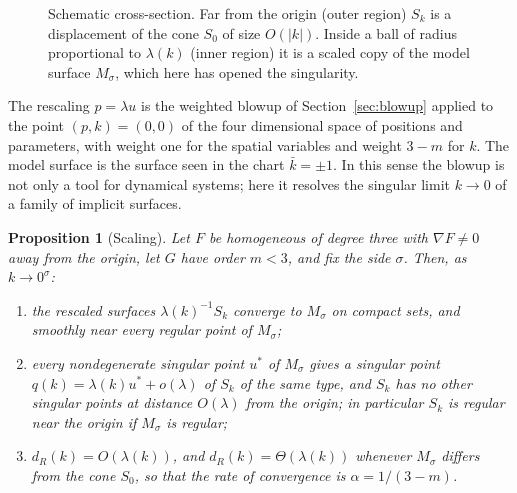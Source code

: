 \documentclass[12pt, a4paper, oneside]{book}
\theoremstyle{plain}
\newtheorem{proposition}[theorem]{Proposition}
\theoremstyle{definition}
\theoremstyle{remark}
\begin{document}
\begin{figure}[!h]
\centering
{}
\caption[Inner and outer region]{Schematic cross-section. Far from the origin
(outer region) $S_k$ is a displacement of the cone $S_0$ of size $O(|k|)$.
Inside a ball of radius proportional to $\lambda(k)$ (inner region) it is a
scaled copy of the model surface $M_\sigma$, which here has opened the
singularity.}
\label{fig:inner-outer}
\end{figure}

The rescaling $p=\lambda u$ is the weighted blowup of
Section~\ref{sec:blowup} applied to the point $(p,k)=(0,0)$ of the four
dimensional space of positions and parameters, with weight one for the spatial
variables and weight $3-m$ for $k$. The model surface is the surface seen in
the chart $\bar k=\pm1$. In this sense the blowup is not only a tool for
dynamical systems; here it resolves the singular limit $k\to0$ of a family of
implicit surfaces.

\begin{proposition}[Scaling]
\label{prop:scaling}
Let $F$ be homogeneous of degree three with $\nabla F\neq0$ away from the
origin, let $G$ have order $m<3$, and fix the side $\sigma$. Then, as
$k\to0^\sigma$:
\begin{enumerate}
    \item the rescaled surfaces $\lambda(k)^{-1}S_k$ converge to $M_\sigma$ on
          compact sets, and smoothly near every regular point of $M_\sigma$;
    \item every nondegenerate singular point $u^\ast$ of $M_\sigma$ gives a
          singular point $q(k)=\lambda(k)u^\ast+o(\lambda)$ of $S_k$ of the same
          type, and $S_k$ has no other singular points at distance
          $O(\lambda)$ from the origin; in particular $S_k$ is regular near the
          origin if $M_\sigma$ is regular;
    \item $d_R(k)=O(\lambda(k))$, and $d_R(k)=\Theta(\lambda(k))$ whenever
          $M_\sigma$ differs from the cone $S_0$, so that the rate of
          convergence is $\alpha=1/(3-m)$.
\end{enumerate}
\end{proposition}
\end{document}
